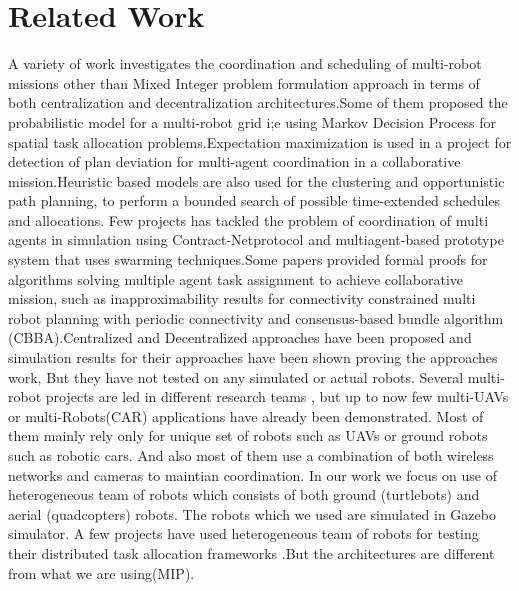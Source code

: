 \documentclass[conference]{IEEEtran}
\begin{document}
\section{Related Work}
A variety of work investigates the coordination and scheduling of multi-robot missions other than Mixed Integer problem formulation approach in terms of both centralization and decentralization architectures.Some of them proposed the probabilistic model for a multi-robot grid i;e using Markov Decision Process for spatial task allocation problems\cite{claes2015effective}\cite{di2011decentralized}\cite{ponda2015cooperative}.Expectation maximization is used in a project for detection of plan deviation for multi-agent coordination in a collaborative mission\cite{claes2015effective}\cite{banerjee2016detection}.Heuristic based models are also used for the clustering and opportunistic path planning, to perform a bounded search of possible time-extended schedules and allocations\cite{jones2011time}\cite{maza2011distributed}\cite{jones2011time}.
 Few projects has tackled the problem of coordination of multi agents in simulation using Contract-Netprotocol\cite{lemaire2004distributed} and multiagent-based prototype system that uses swarming techniques\cite{dasgupta2008multiagent}.Some papers provided formal proofs for algorithms solving multiple agent task assignment to achieve collaborative mission, such as inapproximability results for connectivity constrained multi robot planning with periodic connectivity\cite{hollinger2012multirobot} and consensus-based bundle algorithm (CBBA)\cite{choi2009consensus}\cite{ponda2010decentralized}.Centralized and Decentralized approaches have been proposed and simulation results for their approaches have been shown proving the approaches work, But they have not tested on any simulated or actual robots\cite{feo2016decentralized}\cite{flushing2014mathematical}\cite{galceran2013survey}.
Several multi-robot projects are led in different research teams , but up to now few multi-UAVs or multi-Robots(CAR) applications have already been demonstrated\cite{gancet2005task}\cite{garzon2016multirobot}. Most of them mainly rely only for unique set of robots such as UAVs or ground robots such as robotic cars. And also most of them use a combination of both wireless networks and cameras to maintian coordination. In our work we focus on use of heterogeneous team of robots which consists of both ground (turtlebots) and aerial (quadcopters) robots. The robots which we used are simulated in Gazebo simulator. A few projects have used heterogeneous team of robots for testing their  distributed task allocation frameworks \cite{ponda2010decentralized} \cite{sariel2011generic}\cite{shiroma2009comutar}.But the architectures are different from what we are using(MIP). 
\end{document}
